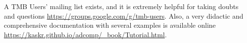 A TMB Users' mailing list exists, and it is extremely helpful for taking
doubts and questions \url{https://groups.google.com/g/tmb-users}. Also,
a very didactic and comprehensive documentation with several examples is
available online
\url{https://kaskr.github.io/adcomp/_book/Tutorial.html}.

